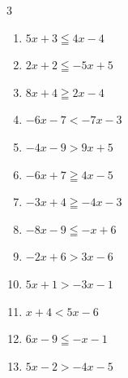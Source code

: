 \begin{multicols}{3}
\begin{enumerate}
  \item $5x+3\leqq 4x-4$

        \phantom{$\displaystyle x\leqq -7$}

  \item $2x+2\leqq -5x+5$


  \item $8x+4\geqq 2x-4$


  \item $-6x-7<-7x-3$

        \phantom{$\displaystyle x<4$}

  \item $-4x-9>9x+5$


  \item $-6x+7\geqq 4x-5$


\columnbreak %

\resetques

  \item $-3x+4\geqq -4x-3$

        \phantom{$\displaystyle x\geqq -7$}

  \item $-8x-9\leqq -x+6$


  \item $-2x+6>3x-6$


  \item $5x+1>-3x-1$


  \item $x+4<5x-6$


  \item $6x-9\leqq -x-1$


  \item $5x-2>-4x-5$



\end{enumerate}
\end{multicols}

